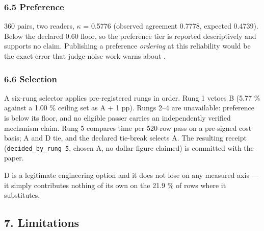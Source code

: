 \documentclass[
  10pt,
]{article}
\begin{document}
\subsubsection{6.5 Preference}\label{preference}

360 pairs, two readers, $\kappa$ = 0.5776 (observed agreement 0.7778, expected
0.4739). Below the declared 0.60 floor, so the preference tier is
reported descriptively and supports no claim. Publishing a preference
\emph{ordering} at this reliability would be the exact error that
judge-noise work warns about \citep{zheng2023judging}.

\subsubsection{6.6 Selection}\label{selection}

A six-rung selector applies pre-registered rungs in order. Rung 1 vetoes
B (5.77 \% against a 1.00 \% ceiling set as A + 1 pp). Rungs 2--4 are
unavailable: preference is below its floor, and no eligible passer
carries an independently verified mechanism claim. Rung 5 compares time
per 520-row pass on a pre-signed cost basis; A and D tie, and the
declared tie-break selects A. The resulting receipt
(\texttt{decided\_by\_rung\ 5}, chosen A, no dollar figure claimed) is
committed with the paper.

D is a legitimate engineering option and it does not lose on any
measured axis --- it simply contributes nothing of its own on the 21.9
\% of rows where it substitutes.

\subsection{7. Limitations}\label{limitations}
\end{document}
